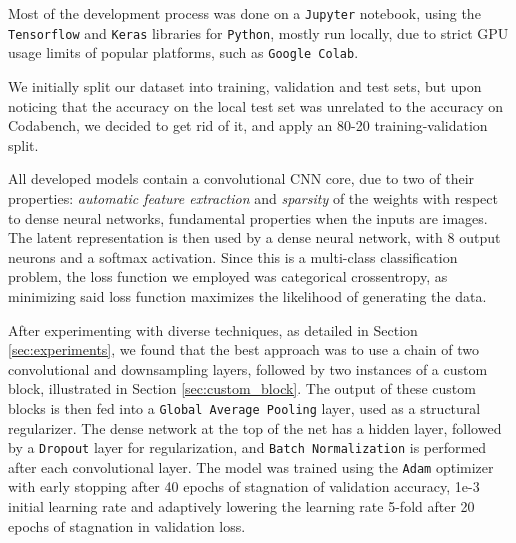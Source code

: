 \documentclass[11pt]{article}
\begin{document}
\begin{multicols}{2}


      Most of the development process was done on a \texttt{Jupyter} notebook, using the \texttt{Tensorflow}\cite{TensorFlow} and \texttt{Keras}\cite{Keras} libraries for \texttt{Python}, mostly run locally, due to strict GPU usage limits of popular platforms, such as \texttt{Google Colab}.

      We initially split our dataset into training, validation and test sets, but upon noticing that the accuracy on the local test set was unrelated to the accuracy on Codabench, we decided to get rid of it, and apply an 80-20 training-validation split.

      All developed models contain a convolutional CNN core, due to two of their properties: \textit{automatic feature extraction} and \textit{sparsity} of the weights with respect to dense neural networks, fundamental properties when the inputs are images. The latent representation is then used by a dense neural network, with 8 output neurons and a softmax activation. Since this is a multi-class classification problem, the loss function we employed was categorical crossentropy, as minimizing said loss function maximizes the likelihood of generating the data\cite{shalev2014understanding}.

      After experimenting with diverse techniques, as detailed in Section \ref{sec:experiments}, we found that the best approach was to use a chain of two convolutional and downsampling layers, followed by two instances of a custom block, illustrated in Section \ref{sec:custom_block}. The output of these custom blocks is then fed into a \texttt{Global Average Pooling}\cite{Lin2013NetworkIN} layer, used as a structural regularizer. The dense network at the top of the net has a hidden layer, followed by a \texttt{Dropout} layer for regularization, and \texttt{Batch Normalization}\cite{pmlr-v37-ioffe15} is performed after each convolutional layer. The model was trained using the \texttt{Adam}\cite{Kingma2014AdamAM} optimizer with early stopping after 40 epochs of stagnation of validation accuracy, 1e-3 initial learning rate and adaptively lowering the learning rate 5-fold after 20 epochs of stagnation in validation loss.


\end{multicols}
\end{document}
